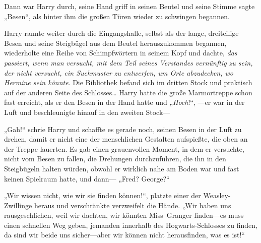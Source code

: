 Dann war Harry durch, seine Hand griff in seinen Beutel und seine Stimme sagte „Besen“, als hinter ihm die großen Türen wieder zu schwingen begannen.

Harry rannte weiter durch die Eingangshalle, selbst als der lange, dreiteilige Besen und seine Steigbügel aus dem Beutel herauszukommen begannen, wiederholte eine Reihe von Schimpfwörtern in seinem Kopf und dachte, \emph{das passiert, wenn man versucht, mit dem Teil seines Verstandes vernünftig zu sein, der nicht versucht, ein Suchmuster zu entwerfen, um Orte abzudecken, wo Hermine sein könnte}. Die Bibliothek befand sich im dritten Stock und praktisch auf der anderen Seite des Schlosses… Harry hatte die große Marmortreppe schon fast erreicht, als er den Besen in der Hand hatte und „\emph{Hoch}!“, —er war in der Luft und beschleunigte hinauf in den zweiten Stock—

„Gah!“ schrie Harry und schaffte es gerade noch, seinen Besen in der Luft zu drehen, damit er nicht eine der menschlichen Gestalten aufspießte, die oben an der Treppe lauerten. Es gab einen grauenvollen Moment, in dem er versuchte, nicht vom Besen zu fallen, die Drehungen durchzuführen, die ihn in den Steigbügeln halten würden, obwohl er wirklich nahe am Boden war und fast keinen Spielraum hatte, und dann— „Fred? George?“

„Wir wissen nicht, wie wir sie finden können!“, platzte einer der Weasley-Zwillinge heraus und verschränkte verzweifelt die Hände. „Wir haben uns rausgeschlichen, weil wir dachten, wir könnten Miss~Granger finden—es muss einen schnellen Weg geben, jemanden innerhalb des Hogwarts-Schlosses zu finden, da sind wir beide uns sicher—aber wir können nicht herausfinden, was es ist!“

